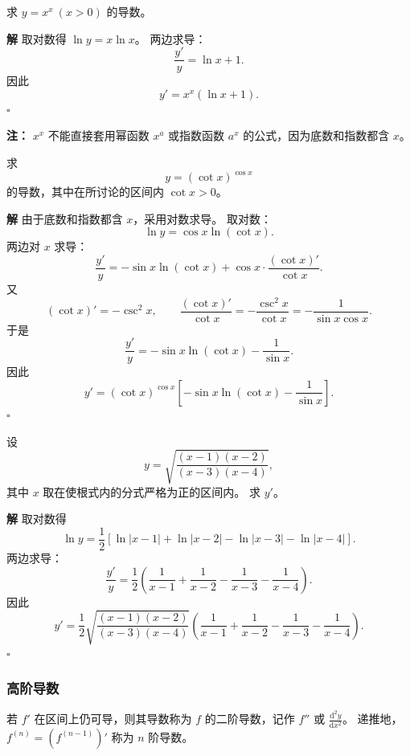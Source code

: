 \documentclass[fontset=fandol]{ctexart}
\newenvironment{solution}{\par\noindent\textbf{解}\quad}{\hfill$\square$\par\vspace{0.8em}}
\newenvironment{warning}{\par\noindent\textbf{注：}\quad}{\par\vspace{0.8em}}
\newcommand{\dd}{\mathrm{d}}
\begin{document}
\begin{example}[对数求导]
	求 $y=x^x\ (x>0)$ 的导数。
\end{example}
\begin{solution}
	取对数得 $\ln y=x\ln x$。 两边求导：
	\[
	\frac{y'}{y}=\ln x+1.
	\]
	因此
	\[
	y'=x^x(\ln x+1).
	\]
\end{solution}
\begin{warning}
	$x^x$ 不能直接套用幂函数 $x^a$ 或指数函数 $a^x$ 的公式，因为底数和指数都含 $x$。
\end{warning}

\begin{example}[变底变指数函数]
	求
	\[
	y=(\cot x)^{\cos x}
	\]
	的导数，其中在所讨论的区间内 $\cot x>0$。
\end{example}
\begin{solution}
	由于底数和指数都含 $x$，采用对数求导。 取对数：
	\[
	\ln y=\cos x\ln(\cot x).
	\]
	两边对 $x$ 求导：
	\[
	\frac{y'}{y}
	=-\sin x\ln(\cot x)+\cos x\cdot\frac{(\cot x)'}{\cot x}.
	\]
	又
	\[
	(\cot x)'=-\csc^2x,\qquad
	\frac{(\cot x)'}{\cot x}
	=-\frac{\csc^2x}{\cot x}
	=-\frac{1}{\sin x\cos x}.
	\]
	于是
	\[
	\frac{y'}{y}
	=-\sin x\ln(\cot x)-\frac1{\sin x}.
	\]
	因此
	\[
	y'=(\cot x)^{\cos x}\left[-\sin x\ln(\cot x)-\frac1{\sin x}\right].
	\]
\end{solution}

\begin{example}[对数求导]
	设
	\[
	y=\sqrt{\frac{(x-1)(x-2)}{(x-3)(x-4)}},
	\]
	其中 $x$ 取在使根式内的分式严格为正的区间内。 求 $y'$。
\end{example}
\begin{solution}
	取对数得
	\[
	\ln y=\frac12\left[\ln|x-1|+\ln|x-2|-\ln|x-3|-\ln|x-4|\right].
	\]
	两边求导：
	\[
	\frac{y'}{y}
	=\frac12\left(\frac1{x-1}+\frac1{x-2}-\frac1{x-3}-\frac1{x-4}\right).
	\]
	因此
	\[
	y'=\frac12\sqrt{\frac{(x-1)(x-2)}{(x-3)(x-4)}}
	\left(\frac1{x-1}+\frac1{x-2}-\frac1{x-3}-\frac1{x-4}\right).
	\]
\end{solution}


\subsubsection*{高阶导数}

\begin{definition}[高阶导数]
若 $f'$ 在区间上仍可导，则其导数称为 $f$ 的二阶导数，记作 $f''$ 或 $\frac{\dd^2y}{\dd x^2}$。 递推地，$f^{(n)}=(f^{(n-1)})'$ 称为 $n$ 阶导数。
\end{definition}
\end{document}
